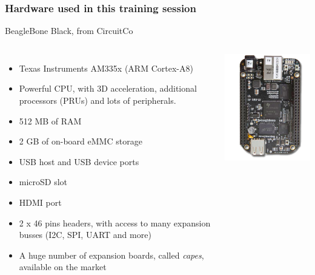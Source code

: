 \begin{frame}
\frametitle{Hardware used in this training session}
  BeagleBone Black, from CircuitCo
  \begin{columns}
    \footnotesize
    \begin{itemize}
      \item Texas Instruments AM335x (ARM Cortex-A8)
      \item Powerful CPU, with 3D acceleration, additional processors
        (PRUs) and lots of peripherals.
      \item 512 MB of RAM
      \item 2 GB of on-board eMMC storage
      \item USB host and USB device ports
      \item microSD slot
      \item HDMI port
      \item 2 x 46 pins headers, with access to many expansion busses
        (I2C, SPI, UART and more)
      \item A huge number of expansion boards, called {\em capes},
        available on the market
    \end{itemize}
    \includegraphics[width=\textwidth]{slides/kernel-beagleboneblack/beagleboneblack.png}
  \end{columns}
\end{frame}
